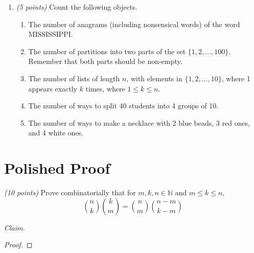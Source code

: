 \documentclass[12pt]{article}
\begin{document}
\begin{enumerate}[itemsep=1.2em]
\item \emph{(5 points)} Count the following objects.

\begin{enumerate}
    \item The number of anagrams (including nonsensical words) of the word MISSISSIPPI.\newline
    
    \item The number of partitions into two parts of the set \( \{1, 2, \dots, 100 \} \). Remember that both parts should be non-empty. \newline
    
    \item The number of lists of length \( n \), with elements in \( \{1, 2, \dots, 10\} \), where 1 appears exactly \( k \) times, where \( 1 \leq k \leq n \). \newline
    
    \item The number of ways to split 40 students into 4 groups of 10. \newline
    
    \item The number of ways to make a necklace with 2 blue beads, 3 red ones, and 4 white ones. \newline
\end{enumerate} 


\end{enumerate}
\newpage %


\section*{Polished Proof} 

\emph{(10 points)} Prove combinatorially that for \( m, k, n \in \mathbb{N} \) and \( m \leq k \leq n \),
\[
\binom{n}{k} \binom{k}{m} = \binom{n}{m} \binom{n-m}{k-m}
\]

\noindent \emph{Claim.}

\begin{proof}
\end{proof}
\end{document}
